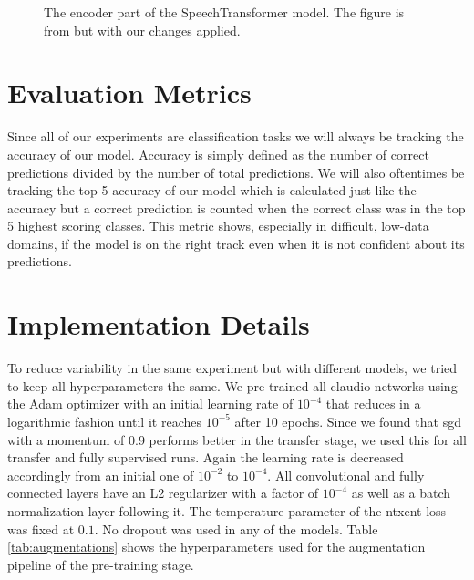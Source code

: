 \begin{figure}[!h]
    \centering
    
    \caption[SpeechTransformer Model]{The encoder part of the SpeechTransformer model. The figure is from \cite{zhao2019speechtransformer} but with our changes applied.}
    \label{fig:speechtransformer}
\end{figure}

\section{Evaluation Metrics}

Since all of our experiments are classification tasks we will always be tracking the accuracy of our model. Accuracy is simply defined as the number of correct predictions divided by the number of total predictions. We will also oftentimes be tracking the top-5 accuracy of our model which is calculated just like the accuracy but a correct prediction is counted when the correct class was in the top 5 highest scoring classes. This metric shows, especially in difficult, low-data domains, if the model is on the right track even when it is not confident about its predictions.

\section{Implementation Details}

To reduce variability in the same experiment but with different models, we tried to keep all hyperparameters the same. We pre-trained all \gls{claudio} networks using the Adam optimizer \cite{kingma2017adam} with an initial learning rate of $10^{-4}$ that reduces in a logarithmic fashion until it reaches $10^{-5}$ after 10 epochs. Since we found that \gls{sgd} with a momentum of 0.9 performs better in the transfer stage, we used this for all transfer and fully supervised runs. Again the learning rate is decreased accordingly from an initial one of $10^{-2}$ to $10^{-4}$. All convolutional and fully connected layers have an L2 regularizer with a factor of $10^{-4}$ as well as a batch normalization layer following it. The temperature parameter of the \gls{ntxent} loss was fixed at $0.1$. No dropout was used in any of the models. Table \ref{tab:augmentations} shows the hyperparameters used for the augmentation pipeline of the pre-training stage.

